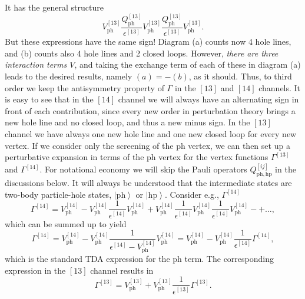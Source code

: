 \documentclass{article}
\begin{document}
It has the general structure
\[
            V_{\mathrm{ph}}^{[13]}
            \frac{Q_{\mathrm{ph}}^{[13]}}{\epsilon^{[13]}}
             V_{\mathrm{ph}}^{[13]}
            \frac{Q_{\mathrm{ph}}^{[13]}}{\epsilon^{[13]}}
            V_{\mathrm{ph}}^{[13]}.
\]
But these expressions have the same sign! Diagram (a) counts
now 4 hole lines, and (b) counts also 4 hole lines and 2 closed
loops. However, {\em there are three interaction terms $V$},
and taking
the exchange term of each of these in diagram (a) leads to
the desired results, namely $(a)=-(b)$, as it should.
Thus, to third order we keep the antisymmetry property of
$\Gamma$ in the $[13]$ and $[14]$ channels.
It is easy to see that in the $[14]$ channel we will always
have an alternating sign in front of each contribution,
since every new order in perturbation theory brings a new hole
line and no closed loop, and thus a new minus sign.
In the $[13]$ channel we have always one new hole line and
one new closed loop for every new vertex.
If we consider only the screening of the ph vertex, we can then set up
a perturbative expansion in terms of the ph vertex for the
vertex functions $\Gamma^{[13]}$ and $\Gamma^{[14]}$.
For notational economy we will skip the Pauli operators
$Q_{\mathrm{ph,hp}}^{[ij]}$ in the discussions below.
It will always be understood that the intermediate states
are two-body particle-hole states, $\left| \mathrm{ph}\right\rangle$ or
$\left| \mathrm{hp}\right\rangle$.
Consider e.g.,
$\Gamma^{[14]}$
\begin{equation}
       \Gamma^{[14]}=V^{[14]}_{\mathrm{ph}}-
        V^{[14]}_{\mathrm{ph}}
        \frac{1}{\epsilon^{[14]}}
        V_{\mathrm{ph}}^{[14]}+
        V^{[14]}_{\mathrm{ph}}
        \frac{1}{\epsilon^{[14]}}
        V^{[14]}_{\mathrm{ph}}
        \frac{1}{\epsilon^{[14]}}
        V^{[14]}_{\mathrm{ph}}-+\dots,
\end{equation}
which can be summed up to yield
\begin{equation}
  \Gamma^{[14]}=V^{[14]}_{\mathrm{ph}}-
   V^{[14]}_{\mathrm{ph}}
   \frac{1}
   {\epsilon^{[14]}-V^{[14]}_{\mathrm{ph}}}
   V^{[14]}_{\mathrm{ph}}=
   V^{[14]}_{\mathrm{ph}}-
   V^{[14]}_{\mathrm{ph}}
   \frac{1}{\epsilon^{[14]}}\Gamma^{[14]},
   \label{eq:screening1}
\end{equation}
which is the standard TDA expression for the ph term.
The corresponding expression in the $[13]$ channel
results in
\begin{equation}
  \Gamma^{[13]}=V^{[13]}_{\mathrm{ph}}+
   V^{[13]}_{\mathrm{ph}}
   \frac{1}{\epsilon^{[13]}}\Gamma^{[13]}.
\end{equation}
\end{document}

